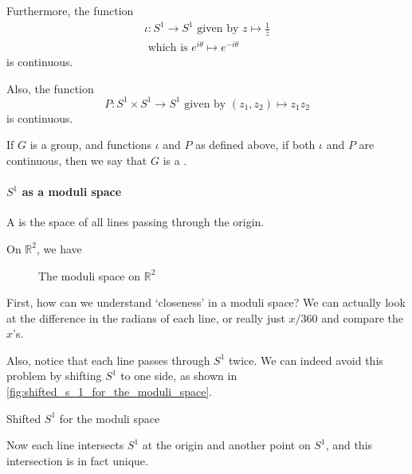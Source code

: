 \documentclass[notoc,notitlepage]{tufte-book}
\begin{document}
Furthermore, the function
\begin{gather*}
  \iota : S^1 \to S^1 \text{ given by } z \mapsto \frac{1}{z} \\
  \text{ which is } e^{i \theta} \mapsto e^{- i \theta}
\end{gather*}
is continuous.

Also, the function
\begin{equation*}
  P : S^1 \times S^1 \to S^1 \text{ given by } (z_1, z_2) \mapsto z_1 z_2
\end{equation*}
is continuous.

\begin{defn}\label{defn:topological_group}
  If $G$ is a group, and functions $\iota$ and $P$ as defined above,
  if both $\iota$ and $P$ are continuous, then we say that $G$ is a
  .
\end{defn}

\paragraph{$S^1$ as a moduli space}

\begin{defn}\label{defn:moduli_space}
  A  is the space of all lines passing through
  the origin.
\end{defn}

On $\mathbb{R}^2$, we have
\begin{figure}[ht]
  \centering
  \caption{The moduli space on $\mathbb{R}^2$}
  \label{fig:the_moduli_space_on_r_2_}
\end{figure}

First, how can we understand `closeness' in a moduli space?
We can actually look at the difference in the radians of each
line, or really just $x / 360$ and compare the $x$'s.

Also, notice that each line passes through $S^1$ twice. We can
indeed avoid this problem by shifting $S^1$ to one side, as
shown in \cref{fig:shifted_s_1_for_the_moduli_space}.
\begin{marginfigure}
  \centering
  \caption{Shifted $S^1$ for the moduli space}\label{fig:shifted_s_1_for_the_moduli_space}
\end{marginfigure}
Now each line intersects $S^1$ at the origin and another
point on $S^1$, and this intersection is in fact unique.
\end{document}
